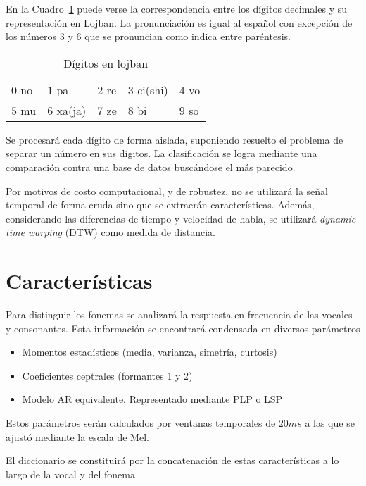 \documentclass[a4paper]{article}
\begin{document}
		En la Cuadro~\ref{tab:digitos} puede verse la correspondencia entre los dígitos decimales
		y su representación en Lojban. La pronunciación es igual al español
		con excepción de los números $3$ y $6$ que se pronuncian como indica
		entre paréntesis.

		\begin{table}[h]
			\center
			\begin{tabular}{lllll}
				$0$ no & $1$ pa & $2$ re & $3$ ci(shi) & $4$ vo\\
				$5$ mu & $6$ xa(ja) & $7$ ze & $8$ bi & $9$ so\\
			\end{tabular}
			\caption{Dígitos en lojban}
			\label{tab:digitos}
		\end{table}

		Se procesará cada dígito de forma aislada, suponiendo
		resuelto el problema de separar un número en sus dígitos.
		La clasificación se logra mediante una comparación contra una
		base de datos buscándose el más parecido.

		Por motivos de costo computacional, y de robustez, no se
		utilizará la señal temporal de forma cruda sino que se
		extraerán características.  Además, considerando las
		diferencias de tiempo y velocidad de habla, se utilizará
		\emph{dynamic time warping} (DTW) como medida de distancia.

	\section{Características}
		Para distinguir los fonemas se analizará la
		respuesta en frecuencia de las vocales y consonantes.
		Esta información se encontrará condensada en diversos
		parámetros %
			\begin{itemize} \itemsep0pt
				\item Momentos estadísticos (media, varianza, simetría, curtosis)
				\item Coeficientes ceptrales (formantes 1 y 2)
				\item Modelo AR equivalente. Representado mediante PLP o LSP
			\end{itemize}

		Estos parámetros serán calculados por ventanas
		temporales de $20ms$ a las que se ajustó mediante la
		escala de Mel.

		El diccionario se constituirá por la concatenación de
		estas características a lo largo de la vocal y del fonema
\end{document}
